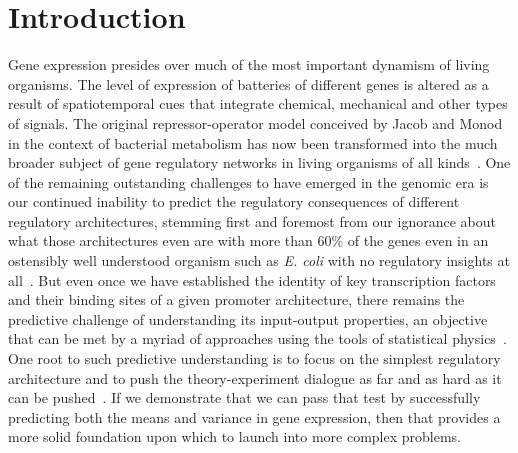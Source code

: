 \section{Introduction}

Gene expression presides over much of the most important dynamism 
of living organisms.   The level of expression of batteries of
different genes is altered as a result of spatiotemporal cues that integrate
chemical, mechanical and other types of signals.  The original repressor-operator model
conceived by Jacob and Monod in the context of bacterial
metabolism has now been transformed into the much
broader subject of gene regulatory networks in living organisms
of all kinds~\cite{Jacob1961, Britten1969, Ben-TabouDe-Leon2007}.  One of the remaining outstanding challenges
to have emerged in the genomic era is our continued
inability to predict the regulatory consequences of
different regulatory architectures, stemming first and foremost
from our ignorance about what those architectures even are with
more than 60\% of the genes even in an ostensibly well understood organism
such as  {\it E. coli} with no regulatory
insights at all~\cite{Rydenfelt2014-2,Belliveau2018,Ghatak2019, Santos_Zavaleta2019}.
But even once we have established the identity of key transcription
factors and their binding sites of a given promoter architecture,  there remains the predictive challenge
of understanding its input-output properties, an objective that can be met
by a myriad of approaches using the tools of statistical physics~\cite{Ackers1982, Shea1985, Buchler2003,Vilar2003a,Vilar2003b, Bintu2005a,Bintu2005c, Gertz2009,Sherman2012, Saiz2013,
Ko1991,Peccoud1995,Record1996,
Kepler2001, Sanchez2008,Shahrezaei2008,Sanchez2011, Michel2010}.  One root
to such predictive understanding is to focus on the simplest
regulatory architecture and to push the theory-experiment
dialogue as far and as hard as it can be pushed~\cite{Phillips2019}.  If we
demonstrate that we can pass that test by successfully predicting
both the means and variance in gene expression, then that provides
a more solid foundation upon which to launch into 
more complex problems.

